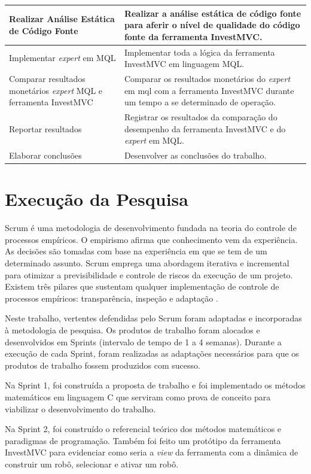 \begin{center}
\begin{longtable}{| p{8cm} | p{8cm} |}
	Realizar Análise Estática de Código Fonte & Realizar a análise estática de código fonte para aferir o nível de qualidade do código fonte da ferramenta InvestMVC.\\ \hline
	Implementar \textit{expert} em MQL & Implementar toda a lógica da ferramenta InvestMVC em linguagem MQL.\\ \hline
	Comparar resultados monetários \textit{expert} MQL e ferramenta InvestMVC & Comparar os resultados monetários do \textit{expert} em mql com a ferramenta InvestMVC durante um tempo a se determinado de operação.\\ \hline
	Reportar resultados & Registrar os resultados da comparação do desempenho da ferramenta InvestMVC e do \textit{expert} em MQL.\\ \hline
	Elaborar conclusões & Desenvolver as conclusões do trabalho.
\label{atividadeMetologia}
\end{longtable}
\end{center}

\section{Execução da Pesquisa}

Scrum é uma metodologia de desenvolvimento fundada na teoria do controle de processos empíricos. O empirismo afirma que conhecimento vem da experiência. As decisões são tomadas com base na experiência em que se tem de um determinado assunto. Scrum emprega uma abordagem iterativa e incremental para otimizar a previsibilidade e controle de riscos da execução de um projeto. Existem três pilares que sustentam qualquer implementação de controle de processos empíricos: transparência, inspeção e adaptação \cite[pág.~4]{schwaber2013}.

Neste trabalho, vertentes defendidas pelo Scrum foram adaptadas e incorporadas à metodologia de pesquisa. Os produtos de  trabalho foram alocados e desenvolvidos em Sprints (intervalo de tempo de 1 a 4 semanas). Durante a execução de cada Sprint, foram realizadas as adaptações necessários para que os produtos de trabalho fossem produzidos com sucesso.

Na Sprint 1, foi construída a proposta de trabalho e foi implementado os métodos matemáticos em linguagem C que serviram como prova de conceito para viabilizar o desenvolvimento do trabalho.

Na Sprint 2, foi construído o referencial teórico dos métodos matemáticos e paradigmas de programação. Também foi feito um protótipo da ferramenta InvestMVC para evidenciar como seria a \textit{view} da ferramenta com a dinâmica de construir um robô, selecionar e ativar um robô.

